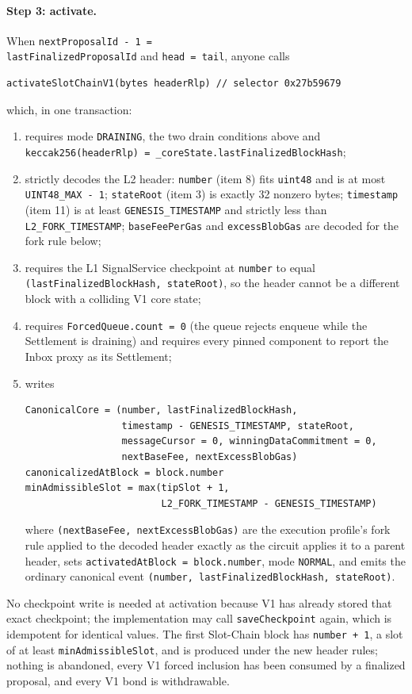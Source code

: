 \documentclass[a4paper,11pt]{article}
\newcommand{\code}[1]{\nolinkurl{#1}}
\begin{document}
\paragraph{Step 3: activate.}  When \code{nextProposalId - 1 =
lastFinalizedProposalId} and \code{head = tail}, anyone calls
\begin{verbatim}
activateSlotChainV1(bytes headerRlp) // selector 0x27b59679
\end{verbatim}
which, in one transaction:
\begin{enumerate}
\item requires mode \code{DRAINING}, the two drain conditions above and
  \code{keccak256(headerRlp) = _coreState.lastFinalizedBlockHash};
\item strictly decodes the L2 header: \code{number} (item 8) fits
  \code{uint48} and is at most \code{UINT48_MAX - 1}; \code{stateRoot}
  (item 3) is exactly 32 nonzero bytes; \code{timestamp} (item 11) is at
  least \code{GENESIS_TIMESTAMP} and strictly less than
  \code{L2_FORK_TIMESTAMP}; \code{baseFeePerGas} and \code{excessBlobGas}
  are decoded for the fork rule below;
\item requires the L1 SignalService checkpoint at \code{number} to equal
  \code{(lastFinalizedBlockHash, stateRoot)}, so the header cannot be a
  different block with a colliding V1 core state;
\item requires \code{ForcedQueue.count = 0} (the queue rejects enqueue while
  the Settlement is draining) and requires every pinned component to report
  the Inbox proxy as its Settlement;
\item writes
\begin{verbatim}
CanonicalCore = (number, lastFinalizedBlockHash,
                 timestamp - GENESIS_TIMESTAMP, stateRoot,
                 messageCursor = 0, winningDataCommitment = 0,
                 nextBaseFee, nextExcessBlobGas)
canonicalizedAtBlock = block.number
minAdmissibleSlot = max(tipSlot + 1,
                        L2_FORK_TIMESTAMP - GENESIS_TIMESTAMP)
\end{verbatim}
  where \code{(nextBaseFee, nextExcessBlobGas)} are the execution profile's
  fork rule applied to the decoded header exactly as the circuit applies it to
  a parent header, sets \code{activatedAtBlock = block.number}, mode
  \code{NORMAL}, and emits the ordinary canonical event
  \code{(number, lastFinalizedBlockHash, stateRoot)}.
\end{enumerate}
No checkpoint write is needed at activation because V1 has already stored
that exact checkpoint; the implementation may call \code{saveCheckpoint}
again, which is idempotent for identical values.  The first Slot-Chain block
has \code{number + 1}, a slot of at least \code{minAdmissibleSlot}, and is
produced under the new header rules; nothing is abandoned, every V1 forced
inclusion has been consumed by a finalized proposal, and every V1 bond is
withdrawable.
\end{document}
